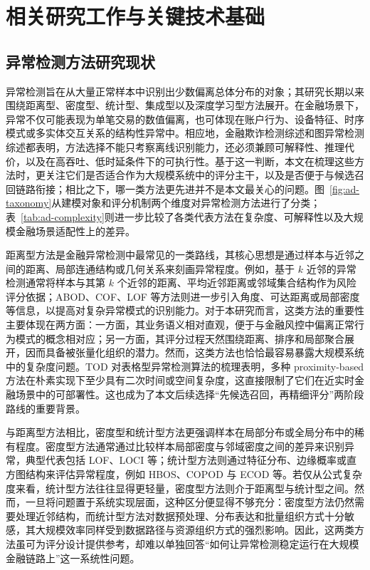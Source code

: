 
\chapter{相关研究工作与关键技术基础}

\section{异常检测方法研究现状}

异常检测旨在从大量正常样本中识别出少数偏离总体分布的对象；其研究长期以来围绕距离型、密度型、统计型、集成型以及深度学习型方法展开\citep{chandola2009survey,markou2003novelty,aggarwal2017outlier,zhao2022tod}。在金融场景下，异常不仅可能表现为单笔交易的数值偏离，也可体现在账户行为、设备特征、时序模式或多实体交互关系的结构性异常中。相应地，金融欺诈检测综述和图异常检测综述都表明，方法选择不能只考察离线识别能力，还必须兼顾可解释性、推理代价，以及在高吞吐、低时延条件下的可执行性\citep{phua2010fraudsurvey,akoglu2015graph}。基于这一判断，本文在梳理这些方法时，更关注它们是否适合作为大规模系统中的评分主干，以及是否便于与候选召回链路衔接；相比之下，哪一类方法更先进并不是本文最关心的问题。图~\ref{fig:ad-taxonomy}从建模对象和评分机制两个维度对异常检测方法进行了分类；表~\ref{tab:ad-complexity}则进一步比较了各类代表方法在复杂度、可解释性以及大规模金融场景适配性上的差异。

距离型方法是金融异常检测中最常见的一类路线，其核心思想是通过样本与近邻之间的距离、局部连通结构或几何关系来刻画异常程度\citep{aggarwal2017outlier,angiulli2002fast}。例如，基于 $k$ 近邻的异常检测通常将样本与其第 $k$ 个近邻的距离、平均近邻距离或邻域集合结构作为风险评分依据；ABOD、COF、LOF 等方法则进一步引入角度、可达距离或局部密度等信息，以提高对复杂异常模式的识别能力。对于本研究而言，这类方法的重要性主要体现在两方面：一方面，其业务语义相对直观，便于与金融风控中偏离正常行为模式的概念相对应；另一方面，其评分过程天然围绕距离、排序和局部聚合展开，因而具备被张量化组织的潜力。然而，这类方法也恰恰最容易暴露大规模系统中的复杂度问题。TOD 对表格型异常检测算法的梳理表明，多种 proximity-based 方法在朴素实现下至少具有二次时间或空间复杂度，这直接限制了它们在近实时金融场景中的可部署性\citep{zhao2022tod}。这也成为了本文后续选择“先候选召回，再精细评分”两阶段路线的重要背景。

与距离型方法相比，密度型和统计型方法更强调样本在局部分布或全局分布中的稀有程度。密度型方法通常通过比较样本局部密度与邻域密度之间的差异来识别异常，典型代表包括 LOF、LOCI 等；统计型方法则通过特征分布、边缘概率或直方图结构来评估异常程度，例如 HBOS、COPOD 与 ECOD 等\citep{zhao2022tod,breunig2000lof}。若仅从公式复杂度来看，统计型方法往往显得更轻量，密度型方法则介于距离型与统计型之间。然而，一旦将问题置于系统实现层面，这种区分便显得不够充分：密度型方法仍然需要处理近邻结构，而统计型方法对数据预处理、分布表达和批量组织方式十分敏感，其大规模效率同样受到数据路径与资源组织方式的强烈影响。因此，这两类方法虽可为评分设计提供参考，却难以单独回答“如何让异常检测稳定运行在大规模金融链路上”这一系统性问题。

